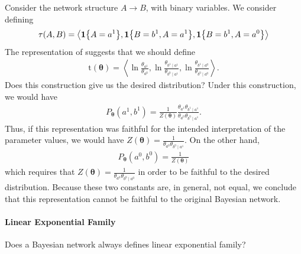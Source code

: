 \documentclass{article}
\begin{document}
\begin{exma}
Consider the network structure $A \rightarrow B$, with binary variables. We consider defining
\begin{align*}
\tau(A, B)=\left\langle \indicate{A=a^{1}}, \indicate{B=b^{1}, A=a^{1}}, \indicate{B=b^{1}, A=a^{0}}\right\rangle
\end{align*}
The representation of \cite[example 8.5]{koller2009probabilistic} suggests that we should define
\begin{align*}
\mathrm{t}(\boldsymbol{\theta})=\left\langle\ln \frac{\theta_{a^{1}}}{\theta_{a^{0}}}, \ln \frac{\theta_{b^{1} \mid a^{1}}}{\theta_{b^{0} \mid a^{1}}}, \ln \frac{\theta_{b^{1} \mid a^{0}}}{\theta_{b^{0} \mid a^{0}}}\right\rangle .
\end{align*}
Does this construction give us the desired distribution? Under this construction, we would have
\begin{align*}
P_{\boldsymbol{\theta}}\left(a^{1}, b^{1}\right)=\frac{1}{Z(\boldsymbol{\theta})} \frac{\theta_{a^{1}} \theta_{b^{1} \mid a^{1}}}{\theta_{a^{0}} \theta_{b^{0} \mid a^{1}}} .
\end{align*}
Thus, if this representation was faithful for the intended interpretation of the parameter values, we would have $Z(\boldsymbol{\theta})=\frac{1}{\theta_{a^{0}} \theta_{b^{0}\mid a^{1}}}$. On the other hand,
\begin{align*}
P_{\boldsymbol{\theta}}\left(a^{0}, b^{0}\right)=\frac{1}{Z(\boldsymbol{\theta})}
\end{align*}
which requires that $Z(\boldsymbol{\theta})=\frac{1}{\theta_{a^{0}} \theta_{b^{0}\mid {a}^0}}$ in order to be faithful to the desired distribution. Because these two constants are, in general, not equal, we conclude that this representation cannot be faithful to the original Bayesian network.
\end{exma}

\paragraph{Linear Exponential Family}
Does a Bayesian network always defines linear exponential family?
\end{document}
